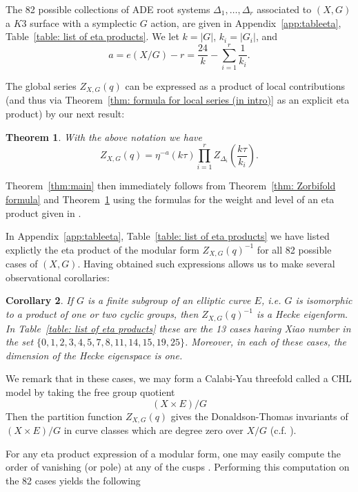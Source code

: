 \documentclass{amsart}
\newtheorem{theorem}{Theorem}[section]
\newtheorem{corollary}[theorem]{Corollary}
\theoremstyle{definition}
\begin{document}
The 82 possible collections of ADE root systems $\Delta_{1},\dots
,\Delta_{r}$ associated to $(X,G)$ a $K3$ surface with a symplectic
$G$ action, are given in Appendix~\ref{app:tableeta},
Table~\ref{table: list of eta products}. We let $k=|G|$,
$k_{i}=|G_{i}|$, and
\[
a = e(X/G) - r=\frac{24}{k}-\sum_{i=1}^{r} \frac{1}{k_{i}}.
\]

The global series $Z_{X,G}(q)$ can be expressed as a product of local
contributions (and thus via Theorem~\ref{thm: formula for local series
(in intro)} as an explicit eta product) by our next result:
\begin{theorem}\label{thm: eta product formula for Z}
With the above notation we have
\[
Z_{X,G}(q) = \eta^{-a}(k\tau )\prod_{i=1}^{r}
Z_{\Delta_{i}}\left(\frac{k\tau}{k_{i}} \right).
\]
\end{theorem}

Theorem~\ref{thm:main} then immediately follows from Theorem~\ref{thm:
Zorbifold formula} and Theorem~\ref{thm: eta product formula for Z}
using the formulas for the weight and level of an eta product given in
\cite[\S~2.1]{kohler2011eta}.



In Appendix~\ref{app:tableeta}, Table~\ref{table: list of eta
products} we have listed explictly the eta product of the modular form
$Z_{X,G}(q)^{-1}$ for all 82 possible cases of $(X,G)$.  Having
obtained such expressions allows us to make several observational
corollaries:

\begin{corollary}\label{cor: if G is a subgp of E then Zinv is a Hecke
eigenform} If $G$ is a finite subgroup of an elliptic curve $E$,
i.e. $G$ is isomorphic to a product of one or two cyclic groups, then
$Z_{X,G}(q)^{-1}$ is a Hecke eigenform. In Table~\ref{table: list of
eta products} these are the 13 cases having Xiao number in the set
$\{0,1,2,3,4,5,7,8,11,14,15,19,25 \}$. Moreover, in each of these
cases, the dimension of the Hecke eigenspace is one.
\end{corollary}

We remark that in these cases, we may form a Calabi-Yau threefold
called a CHL model by taking the free group quotient
\[
(X\times E)/G
\]
Then the partition function $Z_{X,G}(q)$ gives the Donaldson-Thomas
invariants of $(X\times E)/G$ in curve classes which are degree zero
over $X/G$ (c.f. \cite{bryan2018chl}).


For any eta product expression of a modular form, one may easily
compute the order of vanishing (or pole) at any of the cusps
\cite[Cor~2.2]{kohler2011eta}. Performing this computation on the 82
cases yields the following
\end{document}
